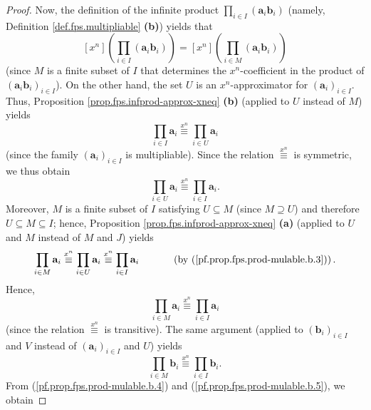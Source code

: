 \begin{fineprint}
\begin{proof}
Now, the definition of the infinite product $\prod_{i\in I}\left(
\mathbf{a}_{i}\mathbf{b}_{i}\right)  $ (namely, Definition
\ref{def.fps.multipliable} \textbf{(b)}) yields that%
\begin{equation}
\left[  x^{n}\right]  \left(  \prod_{i\in I}\left(  \mathbf{a}_{i}%
\mathbf{b}_{i}\right)  \right)  =\left[  x^{n}\right]  \left(  \prod_{i\in
M}\left(  \mathbf{a}_{i}\mathbf{b}_{i}\right)  \right)
\label{pf.prop.fps.prod-mulable.b.2}%
\end{equation}
(since $M$ is a finite subset of $I$ that determines the $x^{n}$-coefficient
in the product of $\left(  \mathbf{a}_{i}\mathbf{b}_{i}\right)  _{i\in I}$).
On the other hand, the set $U$ is an $x^{n}$-approximator for $\left(
\mathbf{a}_{i}\right)  _{i\in I}$. Thus, Proposition
\ref{prop.fps.infprod-approx-xneq} \textbf{(b)} (applied to $U$ instead of
$M$) yields
\[
\prod_{i\in I}\mathbf{a}_{i}\overset{x^{n}}{\equiv}\prod_{i\in U}%
\mathbf{a}_{i}%
\]
(since the family $\left(  \mathbf{a}_{i}\right)  _{i\in I}$ is multipliable).
Since the relation $\overset{x^{n}}{\equiv}$ is symmetric, we thus obtain%
\begin{equation}
\prod_{i\in U}\mathbf{a}_{i}\overset{x^{n}}{\equiv}\prod_{i\in I}%
\mathbf{a}_{i}. \label{pf.prop.fps.prod-mulable.b.3}%
\end{equation}
Moreover, $M$ is a finite subset of $I$ satisfying $U\subseteq M$ (since
$M\supseteq U$) and therefore $U\subseteq M\subseteq I$; hence, Proposition
\ref{prop.fps.infprod-approx-xneq} \textbf{(a)} (applied to $U$ and $M$
instead of $M$ and $J$) yields%
\[
\prod_{i\in M}\mathbf{a}_{i}\overset{x^{n}}{\equiv}\prod_{i\in U}%
\mathbf{a}_{i}\overset{x^{n}}{\equiv}\prod_{i\in I}\mathbf{a}_{i}%
\ \ \ \ \ \ \ \ \ \ \left(  \text{by (\ref{pf.prop.fps.prod-mulable.b.3}%
)}\right)  .
\]
Hence,%
\begin{equation}
\prod_{i\in M}\mathbf{a}_{i}\overset{x^{n}}{\equiv}\prod_{i\in I}%
\mathbf{a}_{i} \label{pf.prop.fps.prod-mulable.b.4}%
\end{equation}
(since the relation $\overset{x^{n}}{\equiv}$ is transitive). The same
argument (applied to $\left(  \mathbf{b}_{i}\right)  _{i\in I}$ and $V$
instead of $\left(  \mathbf{a}_{i}\right)  _{i\in I}$ and $U$) yields%
\begin{equation}
\prod_{i\in M}\mathbf{b}_{i}\overset{x^{n}}{\equiv}\prod_{i\in I}%
\mathbf{b}_{i}. \label{pf.prop.fps.prod-mulable.b.5}%
\end{equation}
From (\ref{pf.prop.fps.prod-mulable.b.4}) and
(\ref{pf.prop.fps.prod-mulable.b.5}), we obtain%

\end{proof}
\end{fineprint}
